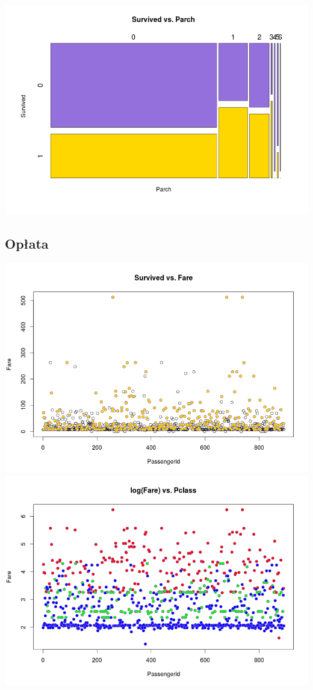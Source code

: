 \documentclass{article}
\begin{document}
\includegraphics[scale=0.40]{images/survived-vs-parch.png}

\subsection{Opłata}

\includegraphics[scale=0.40]{images/survived-vs-fare.png}
\includegraphics[scale=0.40]{images/logfare-vs-pclass.png}
\end{document}

